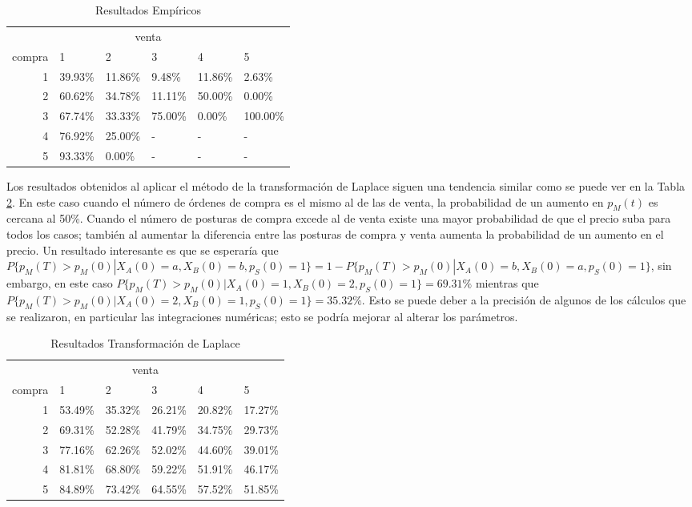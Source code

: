 \documentclass[11pt]{article}
\numberwithin{equation}{section} %
\begin{document}
\begin{table}[htbp]
\centering
\caption{Resultados Empíricos}
\begin{tabular}{r|p{1.5cm}|p{1.5cm}|p{1.5cm}|p{1.5cm}|p{1.5cm}|}
\multicolumn{6}{c}{venta}\\
\cline{2-6}
compra & 1& 2 & 3 & 4 & 5 \\
\cline{2-6}
1 & 39.93\% & 11.86\% & 9.48\% & 11.86\% & 2.63\% \\
2 & 60.62\% & 34.78\% & 11.11\% & 50.00\% & 0.00\% \\
3 & 67.74\% & 33.33\% & 75.00\% & 0.00\% & 100.00\% \\
4 & 76.92\% & 25.00\% & - & - & - \\
5 & 93.33\% & 0.00\% & - & - & - \\
\cline{2-6}
\end{tabular}%
\label{tab:resempirca}%
\end{table}%

Los resultados obtenidos al aplicar el método de la transformación de Laplace siguen una tendencia similar como se puede ver en la Tabla \ref{tab:reslaplace}. En este caso cuando el número de órdenes de compra es el mismo al de las de venta, la probabilidad de un aumento en $p_M(t)$ es cercana al 50\%. Cuando el número de posturas de compra excede al de venta existe una mayor probabilidad de que el precio suba para todos los casos; también al aumentar la diferencia entre las posturas de compra y venta aumenta la probabilidad de un aumento en el precio. Un resultado interesante es que se esperaría que $P\{p_M(T)>p_M(0)|X_A(0)=a,X_B(0)=b,p_S(0)=1\}=1-P\{p_M(T)>p_M(0)|X_A(0)=b,X_B(0)=a,p_S(0)=1\}$, sin embargo, en este caso $P\{p_M(T)>p_M(0)|X_A(0)=1,X_B(0)=2,p_S(0)=1\}=69.31\%$ mientras que $P\{p_M(T)>p_M(0)|X_A(0)=2,X_B(0)=1,p_S(0)=1\}=35.32\%$. Esto se puede deber a la precisión de algunos de los cálculos que se realizaron, en particular las integraciones numéricas; esto se podría mejorar al alterar los parámetros.

\begin{table}[htbp]
\centering
\caption{Resultados Transformación de Laplace}
\begin{tabular}{r|p{1.5cm}|p{1.5cm}|p{1.5cm}|p{1.5cm}|p{1.5cm}|}
\multicolumn{6}{c}{venta}\\
\cline{2-6}
compra & 1& 2 & 3 & 4 & 5 \\
\cline{2-6}
1 & 53.49\% & 35.32\% & 26.21\% & 20.82\% & 17.27\% \\
2 & 69.31\% & 52.28\% & 41.79\% & 34.75\% & 29.73\% \\
3 & 77.16\% & 62.26\% & 52.02\% & 44.60\% & 39.01\% \\
4 & 81.81\% & 68.80\% & 59.22\% & 51.91\% & 46.17\% \\
5 & 84.89\% & 73.42\% & 64.55\% & 57.52\% & 51.85\% \\
\cline{2-6}
\end{tabular}%
\label{tab:reslaplace}%
\end{table}%
\end{document}
